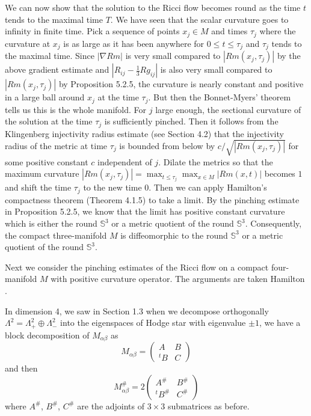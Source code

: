 We can now show that the solution to the Ricci flow becomes round
as the time $t$ tends to the maximal time $T$. We have seen that
the scalar curvature goes to infinity in finite time. Pick a
sequence of points $x_j\in M$ and times $\tau_j$ where the
curvature at $x_j$ is as large as it has been anywhere for $0\le
t\le\tau_j$ and $\tau_j$ tends to the maximal time. Since $|\nabla
Rm|$ is very small compared to $|Rm(x_j,\tau_j)|$ by the above
gradient estimate and $|R_{ij}-\frac{1}{3}Rg_{ij}|$ is also very
small compared to $|Rm(x_j,\tau_j)|$ by Proposition 5.2.5, the
curvature is nearly constant and positive in a large ball around
$x_j$ at the time $\tau_j$. But then the Bonnet-Myers' theorem
tells us this is the whole manifold. For $j$ large enough, the
sectional curvature of the solution at the time $\tau_j$ is
sufficiently pinched. Then it follows from the Klingenberg
injectivity radius estimate (see Section 4.2) that the injectivity
radius of the metric at time $\tau_j$ is bounded from below by
$c/\sqrt{|Rm(x_j,\tau_j)|}$ for some positive constant $c$
independent of $j$. Dilate the metrics so that the maximum
curvature $|Rm(x_j,\tau_j)|=\max_{t\leq\tau_j}\max_{x \in M}
|Rm(x,t)|$ becomes $1$ and shift the time $\tau_j$ to the new time
$0$. Then we can apply Hamilton's compactness theorem (Theorem
4.1.5) to take a limit. By the pinching estimate in Proposition
5.2.5, we know that the limit has positive constant curvature
which is either the round $\mathbb{S}^3$ or a metric quotient of
the round $\mathbb{S}^3$. Consequently, the compact three-manifold
$M$ is diffeomorphic to the round $\mathbb{S}^3$ or a metric
quotient of the round $\mathbb{S}^3$.
\endproof

Next we consider the pinching estimates of the Ricci flow on a
compact four-manifold $M$ with positive curvature operator. The
arguments are taken Hamilton \cite{Ha86}.

In dimension 4, we saw in Section 1.3 when we decompose
orthogonally $\Lambda^2=\Lambda^2_+\oplus\Lambda^2_-$ into the
eigenspaces of Hodge star with eigenvalue $\pm1$, we have a block
decomposition of $M_{\alpha\beta}$ as
$$
M_{\alpha\beta}=\left(\begin{array}{cc} A&  B\\ {}^tB&
C\end{array}\right)
$$
and then
$$
M_{\alpha\beta}^\#=2\left(\begin{array}{cc} A^\#&  B^\#\\
{}^tB^\#&  C^\#\end{array}\right)
$$
where $A^\#$, $B^\#$, $C^\#$ are the adjoints of $3\times3$
submatrices as before.

